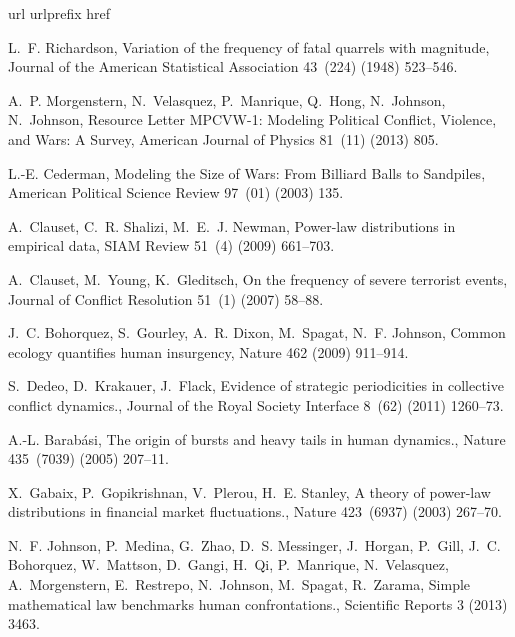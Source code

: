 \documentclass[preprint,12pt]{elsarticle}
\begin{document}
 
\begin{thebibliography}{10}
\expandafter\ifx\csname url\endcsname\relax
  \def\url#1{\texttt{#1}}\fi
\expandafter\ifx\csname urlprefix\endcsname\relax\def\urlprefix{URL }\fi
\expandafter\ifx\csname href\endcsname\relax
  \def\href#1#2{#2} \def\path#1{#1}\fi

L.~F. Richardson, {Variation of the frequency of fatal quarrels with
  magnitude}, Journal of the American Statistical Association 43~(224) (1948)
  523--546.

A.~P. Morgenstern, N.~Velasquez, P.~Manrique, Q.~Hong, N.~Johnson, N.~Johnson,
  {Resource Letter MPCVW-1: Modeling Political Conflict, Violence, and Wars: A
  Survey}, American Journal of Physics 81~(11) (2013) 805.

L.-E. Cederman, {Modeling the Size of Wars: From Billiard Balls to Sandpiles},
  American Political Science Review 97~(01) (2003) 135.

A.~Clauset, C.~R. Shalizi, M.~E.~J. Newman, {Power-law distributions in
  empirical data}, SIAM Review 51~(4) (2009) 661--703.

A.~Clauset, M.~Young, K.~Gleditsch, {On the frequency of severe terrorist
  events}, Journal of Conflict Resolution 51~(1) (2007) 58--88.

J.~C. Bohorquez, S.~Gourley, A.~R. Dixon, M.~Spagat, N.~F. Johnson, Common
  ecology quantifies human insurgency, Nature 462 (2009) 911--914.

S.~Dedeo, D.~Krakauer, J.~Flack, {Evidence of strategic periodicities in
  collective conflict dynamics.}, Journal of the Royal Society Interface 8~(62)
  (2011) 1260--73.

A.-L. Barab\'{a}si, {The origin of bursts and heavy tails in human dynamics.},
  Nature 435~(7039) (2005) 207--11.

X.~Gabaix, P.~Gopikrishnan, V.~Plerou, H.~E. Stanley, {A theory of power-law
  distributions in financial market fluctuations.}, Nature 423~(6937) (2003)
  267--70.

N.~F. Johnson, P.~Medina, G.~Zhao, D.~S. Messinger, J.~Horgan, P.~Gill, J.~C.
  Bohorquez, W.~Mattson, D.~Gangi, H.~Qi, P.~Manrique, N.~Velasquez,
  A.~Morgenstern, E.~Restrepo, N.~Johnson, M.~Spagat, R.~Zarama, {Simple
  mathematical law benchmarks human confrontations.}, Scientific Reports 3
  (2013) 3463.


\end{thebibliography}
\end{document}
